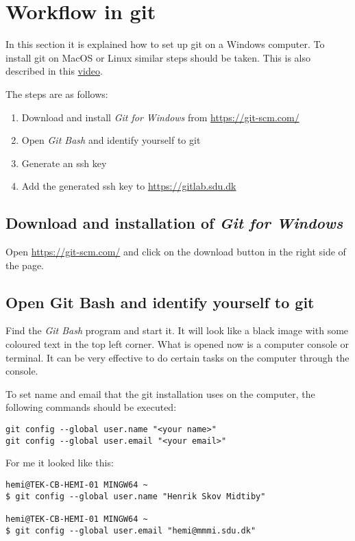\section{Workflow in git}

In this section it is explained how to set up git on 
a Windows computer.
To install git on MacOS or Linux similar steps should be taken.
This is also described in this \href{https://tekvideo.sdu.dk/t/henrikmidtiby/E-MAIP-2021/2021/1/blok04/3}{video}.

The steps are as follows:
\begin{enumerate}
\item	Download and install \emph{Git for Windows} from \url{https://git-scm.com/}
\item	Open \emph{Git Bash} and identify yourself to git
\item	Generate an ssh key
\item	Add the generated ssh key to \url{https://gitlab.sdu.dk}
\end{enumerate}

\subsection{Download and installation of \emph{Git for Windows}}

Open \url{https://git-scm.com/} and click on the download button
in the right side of the page.

\subsection{Open Git Bash and identify yourself to git}

Find the \emph{Git Bash} program and start it.
It will look like a black image with some coloured text in the 
top left corner.
What is opened now is a computer console or terminal.
It can be very effective to do certain tasks on the computer through the console.

To set name and email that the git installation uses on the 
computer, the following commands should be executed:
\begin{verbatim}
git config --global user.name "<your name>"
git config --global user.email "<your email>"
\end{verbatim}

For me it looked like this:
\begin{verbatim}
hemi@TEK-CB-HEMI-01 MINGW64 ~
$ git config --global user.name "Henrik Skov Midtiby"

hemi@TEK-CB-HEMI-01 MINGW64 ~
$ git config --global user.email "hemi@mmmi.sdu.dk"
\end{verbatim}

